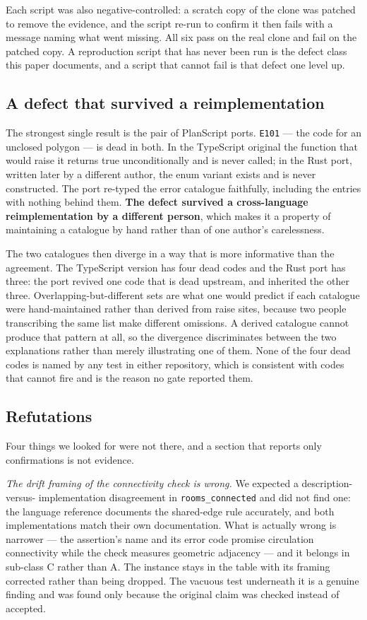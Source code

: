 \documentclass[10pt,journal,compsoc]{IEEEtran}
\begin{document}
Each script was also negative-controlled: a scratch copy of the clone was patched to remove the
evidence, and the script re-run to confirm it then fails with a message naming what went
missing. All six pass on the real clone and fail on the patched copy. A reproduction script
that has never been run is the defect class this paper documents, and a script that cannot fail
is that defect one level up.

\subsection{A defect that survived a reimplementation}

The strongest single result is the pair of PlanScript ports. \texttt{E101} --- the code for an
unclosed polygon --- is dead in both. In the TypeScript original the function that would raise
it returns true unconditionally and is never called; in the Rust port, written later by a
different author, the enum variant exists and is never constructed. The port re-typed the error
catalogue faithfully, including the entries with nothing behind them. \textbf{The defect
survived a cross-language reimplementation by a different person}, which makes it a property of
maintaining a catalogue by hand rather than of one author's carelessness.

The two catalogues then diverge in a way that is more informative than the agreement. The
TypeScript version has four dead codes and the Rust port has three: the port revived one code
that is dead upstream, and inherited the other three. Overlapping-but-different sets are what
one would predict if each catalogue were hand-maintained rather than derived from raise sites,
because two people transcribing the same list make different omissions. A derived catalogue
cannot produce that pattern at all, so the divergence discriminates between the two
explanations rather than merely illustrating one of them. None of the four
dead codes is named by any test in either repository, which is consistent with codes that cannot
fire and is the reason no gate reported them.

\subsection{Refutations}

Four things we looked for were not there, and a section that reports only confirmations is not
evidence.

\emph{The drift framing of the connectivity check is wrong.} We expected a description-versus-%
implementation disagreement in \texttt{rooms\_connected} and did not find one: the language
reference documents the shared-edge rule accurately, and both implementations match their own
documentation. What is actually wrong is narrower --- the assertion's name and its error code
promise circulation connectivity while the check measures geometric adjacency --- and it belongs
in sub-class C rather than A. The instance stays in the table with its framing corrected rather
than being dropped. The vacuous test underneath it is a genuine finding and was found only
because the original claim was checked instead of accepted.
\end{document}
